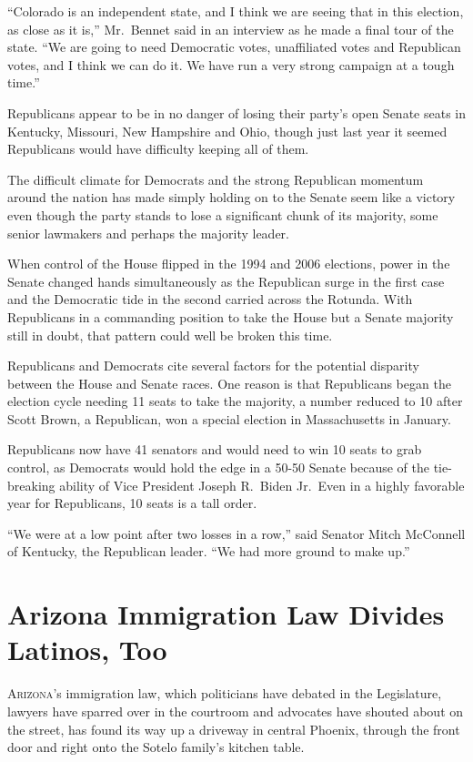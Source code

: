 ﻿\documentclass[12pt]{article}
\begin{document}
``Colorado is an independent state, and I think we are seeing that in this election, as close as it
is,'' Mr.~Bennet said in an interview as he made a final tour of the state. ``We are going to need
Democratic votes, unaffiliated votes and Republican votes, and I think we can do it. We have run a
very strong campaign at a tough time.''

Republicans appear to be in no danger of losing their party's open Senate seats in Kentucky,
Missouri, New Hampshire and Ohio, though just last year it seemed Republicans would have difficulty
keeping all of them.

The difficult climate for Democrats and the strong Republican momentum around the nation has made
simply holding on to the Senate seem like a victory even though the party stands to lose a
significant chunk of its majority, some senior lawmakers and perhaps the majority leader.

When control of the House flipped in the 1994 and 2006 elections, power in the Senate changed hands
simultaneously as the Republican surge in the first case and the Democratic tide in the second
carried across the Rotunda. With Republicans in a commanding position to take the House but a Senate
majority still in doubt, that pattern could well be broken this time.

Republicans and Democrats cite several factors for the potential disparity between the House and
Senate races. One reason is that Republicans began the election cycle needing 11 seats to take the
majority, a number reduced to 10 after Scott Brown, a Republican, won a special election in
Massachusetts in January.

Republicans now have 41 senators and would need to win 10 seats to grab control, as Democrats would
hold the edge in a 50-50 Senate because of the tie-breaking ability of Vice President Joseph
R.~Biden Jr.~Even in a highly favorable year for Republicans, 10 seats is a tall order.

``We were at a low point after two losses in a row,'' said Senator Mitch McConnell of Kentucky, the
Republican leader. ``We had more ground to make up.''

\section{Arizona Immigration Law Divides Latinos, Too}

\lettrine{A}{rizona}'s immigration law, which politicians have debated in
the Legislature, lawyers have sparred over in the courtroom and advocates have shouted about on the
street, has found its way up a driveway in central Phoenix, through the front door and right onto
the Sotelo family's kitchen table.
\end{document}

